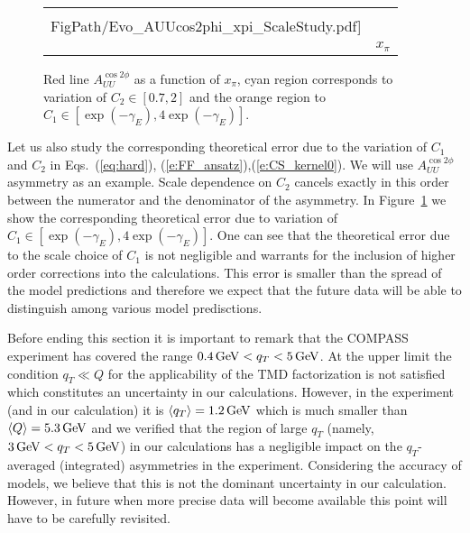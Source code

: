 \documentclass[a4paper]{article}
\newcommand*{\FigPath}{./figs}%
\newcommand{\ps}[1]{{\color{magenta}#1}}
\begin{document}
\begin{figure}[t]
\centering
  \begin{tabular}{cc}
		 \rotatebox[origin=c]{90}{{$A_{UU}^{\cos 2\phi}$}} &  \hspace{-2.5mm}\raisebox{-.5\height}{\texttt{[image: \\FigPath/Evo\_AUUcos2phi\_xpi\_ScaleStudy.pdf]}}  \\
		& $x_\pi$  \\	
  \end{tabular}
\vspace{-3.5mm}
\caption{\label{auucos2px-COM-study} 
 Red line $A_{UU}^{\cos 2\phi}$ as a function of 
 $x_{\pi}$, cyan region corresponds to variation of  $C_2\in [0.7,2]$ and the orange region to $C_1\in [\exp(-\gamma_E), 4 \exp(-\gamma_E)]$.}
\end{figure}
\ps{Let us also study the corresponding theoretical error due to the variation of $C_1$ and $C_2$ in Eqs.~(\ref{eq:hard}), (\ref{e:FF_ansatz}),(\ref{e:CS_kernel0}). We will use $A_{UU}^{\cos 2\phi}$ asymmetry as an example. Scale dependence on $C_2$ cancels exactly in this order between the numerator and the denominator of the asymmetry. In Figure~\ref{auucos2px-COM-study} we show the corresponding theoretical error due to variation of $C_1\in [\exp(-\gamma_E), 4 \exp(-\gamma_E)]$. One can see that the theoretical error due to the scale choice of $C_1$ is not negligible and warrants for the inclusion of higher order corrections into the calculations. This error is smaller than the spread of the model predictions and therefore we expect that the future data will be able to distinguish among various model predisctions.}


Before ending this section it is important to remark that the COMPASS
experiment has covered the range $0.4\,{\rm GeV} < q_T < 5\,{\rm GeV}$. 
At the upper limit the condition $q_T \ll  Q$ for
the applicability of the TMD factorization is not satisfied which 
constitutes an  uncertainty in our calculations.
However, in the experiment (and in our calculation) it is 
$\langle q_T\rangle = 1.2 \,{\rm GeV}$ which is much smaller 
than $\langle Q \rangle = 5.3\,{\rm GeV}$ and we verified that 
the region of large $q_T$ (namely, $3\,{\rm GeV} < q_T < 5\,{\rm GeV}$) 
in our calculations has a negligible impact on
the $q_T$-averaged (integrated) asymmetries in the experiment.
Considering the accuracy of models, we believe that this is not 
the dominant uncertainty in our calculation. However, in future 
when more precise data will become available this point will have
to be carefully revisited.
\end{document}
